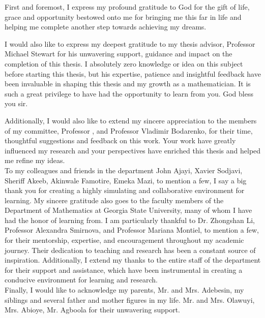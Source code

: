 First and foremost, I express my profound gratitude to God for the gift of life, grace and opportunity bestowed onto me for bringing me this far in life and helping me complete another step towards achieving my dreams.

I would also like to express my deepest gratitude to my thesis advisor, Professor Michael Stewart for his unwavering support, guidance and impact on the completion of this thesis. I  absolutely zero knowledge or idea on this subject before starting this thesis, but his expertise, patience and insightful feedback have been invaluable in shaping this thesis and my growth as a mathematician. It is such a great privilege to have had the opportunity to learn from you. God bless you sir.

Additionally, I would also like to extend my sincere appreciation to the members of my committee, Professor , and Professor Vladimir Bodarenko, for their time, thoughtful suggestions and feedback on this work. Your work have greatly influenced my research and your perspectives have enriched this thesis and helped me refine my ideas.\\[5pt]
To my colleagues and friends in the department \textemdash {} John Ajayi, Xavier Sodjavi, Sheriff Akeeb, Akinwale Famotire, Emeka Mazi, to mention a few, I say a big thank you for creating a highly simulating and collaborative environment for learning. My sincere gratitude also goes to the faculty members of the Department of Mathematics at Georgia State University, many of whom I have had the honor of learning from. I am particularly thankful to Dr. Zhongshan Li, Professor Alexandra Smirnova, and Professor Mariana Montiel, to mention a few, for their mentorship, expertise, and encouragement throughout my academic journey. Their dedication to teaching and research has been a constant source of inspiration. Additionally, I extend my thanks to the entire staff of the department for their support and assistance, which have been instrumental in creating a conducive environment for learning and research.\\[5pt]
Finally, I would like to acknowledge my parents, Mr. and Mrs. Adebesin, my siblings and several father and mother figures in my life. Mr. and Mrs. Olawuyi, Mrs. Abioye, Mr. Agboola for their unwavering support. 
